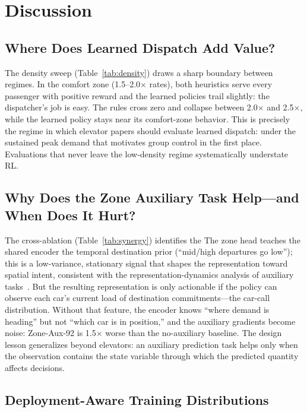 \documentclass[conference]{IEEEtran}
\begin{document}
\section{Discussion}
\label{sec:discussion}

\subsection{Where Does Learned Dispatch Add Value?}

The density sweep (Table~\ref{tab:density}) draws a sharp boundary
between regimes. In the comfort zone (1.5--2.0$\times$ rates), both
heuristics serve every passenger with positive reward and the
learned policies trail slightly: the dispatcher's job is easy. The
rules cross zero and collapse between 2.0$\times$ and 2.5$\times$,
while the learned policy stays near its comfort-zone behavior. This
is precisely the regime in which elevator papers should evaluate
learned dispatch: under the sustained peak demand that motivates
group control in the first place. Evaluations that never leave the
low-density regime systematically understate RL.
\subsection{Why Does the Zone Auxiliary Task Help---and When Does It Hurt?}

The cross-ablation (Table~\ref{tab:synergy}) identifies the
The zone head teaches the shared
encoder the temporal destination prior (``mid/high departures go
low''); this is a low-variance, stationary signal that shapes the
representation toward spatial intent, consistent with the
representation-dynamics analysis of auxiliary
tasks~\cite{lyle2021auxiliary}. But the resulting
representation is only actionable if the policy can observe each
car's current load of destination commitments---the car-call
distribution. Without that feature, the encoder knows ``where demand
is heading'' but not ``which car is in position,'' and the auxiliary
gradients become noise: Zone-Aux-92 is 1.5$\times$ worse than the
no-auxiliary baseline. The design lesson generalizes beyond
elevators: an auxiliary prediction task helps only when the
observation contains the state variable through which the predicted
quantity affects decisions.

\subsection{Deployment-Aware Training Distributions}
\end{document}
